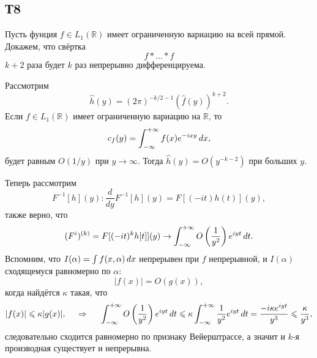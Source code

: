 \subsection{Т8}

Пусть фунция $f \in L_1 (\mathbb{R})$ имеет ограниченную вариацию на всей прямой. Докажем, что свёртка 
\begin{equation*}
    f * \ldots * f
\end{equation*}
$k+ 2$ раза будет $k$ раз непрерывно дифференцируема.

Рассмотрим
\begin{equation*}
    \hat{h} (y) = (2\pi)^{-k/2-1} (\hat{f} (y))^{k+2}.
\end{equation*}
Если $f \in L_1 (\mathbb{R})$ имеет ограниченную вариацию на $\mathbb{R}$, то 
\begin{equation*}
    c_f (y) = \int_{-\infty}^{+\infty} f(x) e^{-ixy} \, d x,
\end{equation*}
будет равным $O(1/y)$ при $y \to \infty$. Тогда $\hat{h} (y) = O(y^{-k-2})$ при больших $y$.

Теперь рассмотрим 
\begin{equation*}
    F^{-1}[h](y)\colon \frac{d }{d y} F^{-1} [h] (y) = F[(-it) h(t)] (y),
\end{equation*}
также верно, что
\begin{equation*}
    (F^i)^{(k)} = F[(-it)^k h[t]](y) \to \int_{-\infty}^{+\infty} O\left(\frac{1}{y^2}\right) e^{i y t} \, d t.
\end{equation*}
Вспомним, что $I(\alpha) = \int f(x, \alpha) \, d x$ непрерывен при  $f$ непрерывной, и $I(\alpha)$ сходящемуся равномерно по $\alpha$:
\begin{equation*}
    |f(x)| = O(g(x)),
\end{equation*}
когда найдётся $\kappa$ такая, что
\begin{equation*}
    |f(x)| \leqslant \kappa |g(x)|,
    \hspace{0.5cm} \Rightarrow \hspace{0.5cm}
    \int_{-\infty}^{+\infty}  O\left(\frac{1}{y^2}\right) e^{i yt} \, d t \leqslant \kappa
    \int_{-\infty}^{+\infty} \frac{1}{y^2} e^{i y t} \, d t = \frac{-i \kappa e^{i y t}}{y^3} \leqslant \frac{\kappa}{y^3},
\end{equation*}
следовательно сходится равномерно по признаку Вейерштрассе,  а значит и $k$-я производная существует и непрерывна.